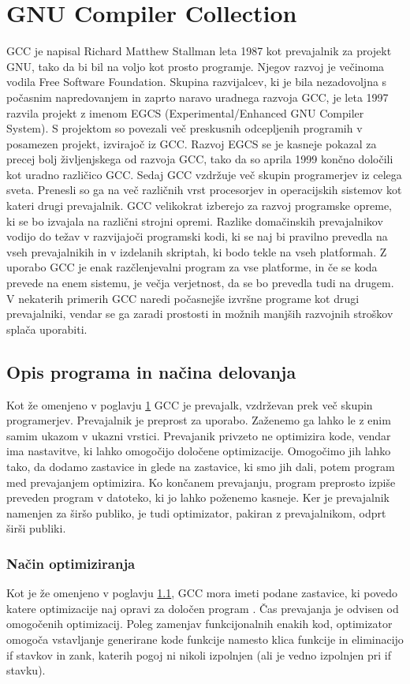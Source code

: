 \documentclass[a4paper, 12pt]{book}
\begin{document}
\chapter{GNU Compiler Collection}
\label{ch3}
GCC je napisal Richard Matthew Stallman leta 1987 kot prevajalnik za projekt GNU, tako da bi bil na voljo kot prosto programje. Njegov razvoj je večinoma vodila Free Software Foundation. Skupina razvijalcev, ki je bila nezadovoljna s počasnim napredovanjem in zaprto naravo uradnega razvoja GCC, je leta 1997 razvila projekt z imenom EGCS (Experimental/Enhanced GNU Compiler System). S projektom so povezali več preskusnih odcepljenih programih v posamezen projekt, izvirajoč iz GCC. Razvoj EGCS se je kasneje pokazal za precej bolj življenjskega od razvoja GCC, tako da so aprila 1999 končno določili kot uradno različico GCC. Sedaj GCC vzdržuje več skupin programerjev iz celega sveta. Prenesli so ga na več različnih vrst procesorjev in operacijskih sistemov kot kateri drugi prevajalnik. GCC velikokrat izberejo za razvoj programske opreme, ki se bo izvajala na različni strojni opremi. Razlike domačinskih prevajalnikov vodijo do težav v razvijajoči programski kodi, ki se naj bi pravilno prevedla na vseh prevajalnikih in v izdelanih skriptah, ki bodo tekle na vseh platformah. Z uporabo GCC je enak razčlenjevalni program za vse platforme, in če se koda prevede na enem sistemu, je večja verjetnost, da se bo prevedla tudi na drugem. V nekaterih primerih GCC naredi počasnejše izvršne programe kot drugi prevajalniki, vendar se ga zaradi prostosti in možnih manjših razvojnih stroškov splača uporabiti.
\section{Opis programa in načina delovanja}
\label{loi}
Kot že omenjeno v poglavju \ref{ch3} GCC je prevajalk, vzdrževan prek več skupin programerjev. Prevajalnik je preprost za uporabo. Zaženemo ga lahko le z enim samim ukazom v ukazni vrstici. Prevajanik privzeto ne optimizira kode, vendar ima nastavitve, ki lahko omogočijo določene optimizacije. Omogočimo jih lahko tako, da dodamo zastavice in glede na zastavice, ki smo jih dali, potem program med prevajanjem optimizira. Ko končanem prevajanju, program preprosto izpiše preveden program v datoteko, ki jo lahko poženemo kasneje. Ker je prevajalnik namenjen za širšo publiko, je tudi optimizator, pakiran z prevajalnikom, odprt širši publiki. 
\subsection{Način optimiziranja}
Kot je že omenjeno v poglavju \ref{loi}, GCC mora imeti podane zastavice, ki povedo katere optimizacije naj opravi za določen program \cite{gcc}. Čas prevajanja je odvisen od omogočenih optimizacij. Poleg zamenjav funkcijonalnih enakih kod, optimizator omogoča vstavljanje generirane kode funkcije namesto klica funkcije in eliminacijo if stavkov in zank, katerih pogoj ni nikoli izpolnjen (ali je vedno izpolnjen pri if stavku).   
\end{document}
